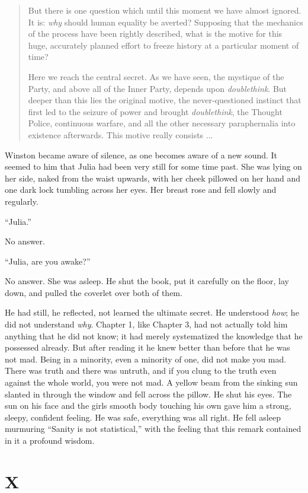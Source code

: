 \begin{quotation}
But there is one question which until this moment we have almost
ignored. It is: \emph{why} should human equality be averted? Supposing
that the mechanics of the process have been rightly described, what is
the motive for this huge, accurately planned effort to freeze history at
a particular moment of time?

Here we reach the central secret. As we have seen, the mystique of the
Party, and above all of the Inner Party, depends upon
\emph{doublethink}. But deeper than this lies the original motive, the
never-questioned instinct that first led to the seizure of power and
brought \emph{doublethink}, the Thought Police, continuous warfare, and
all the other necessary paraphernalia into existence afterwards. This
motive really consists ...
\end{quotation}

Winston became aware of silence, as one becomes aware of a new sound. It
seemed to him that Julia had been very still for some time past. She was
lying on her side, naked from the waist upwards, with her cheek pillowed
on her hand and one dark lock tumbling across her eyes. Her breast rose
and fell slowly and regularly.

``Julia.''

No answer.

``Julia, are you awake?''

No answer. She was asleep. He shut the book, put it carefully on the
floor, lay down, and pulled the coverlet over both of them.

He had still, he reflected, not learned the ultimate secret. He
understood \emph{how}; he did not understand \emph{why}. Chapter 1, like
Chapter 3, had not actually told him anything that he did not know; it
had merely systematized the knowledge that he possessed already. But
after reading it he knew better than before that he was not mad. Being
in a minority, even a minority of one, did not make you mad. There was
truth and there was untruth, and if you clung to the truth even against
the whole world, you were not mad. A yellow beam from the sinking sun
slanted in through the window and fell across the pillow. He shut his
eyes. The sun on his face and the girl\textquotesingle s smooth body
touching his own gave him a strong, sleepy, confident feeling. He was
safe, everything was all right. He fell asleep murmuring ``Sanity is not
statistical,'' with the feeling that this remark contained in it a
profound wisdom.


\section{X}\label{x}

